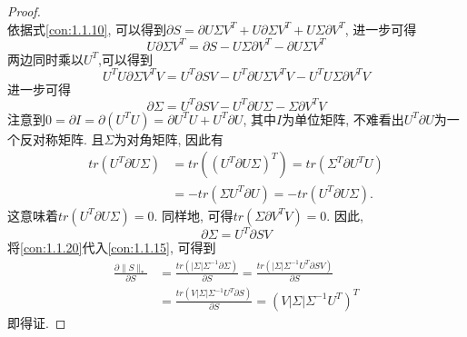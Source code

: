 \documentclass[lang=cn,10pt]{gorgeousnbook}
\numberwithin{equation}{section}%
\numberwithin{figure}{section}%
\begin{document}
\begin{proof}
\begin{equation}
\label{con:1.1.15}
\end{equation}
依据式\eqref{con:1.1.10}, 可以得到$\partial S=\partial U\varSigma V^T+U\partial \varSigma V^T+U\varSigma \partial V^T$, 进一步可得
\begin{equation}
U\partial \varSigma V^T=\partial S-U\varSigma \partial V^T-\partial U\varSigma V^T
\label{con:1.1.16}
\end{equation}
两边同时乘以$U^T$,可以得到
\begin{equation}
U^TU\partial \varSigma V^TV=U^T\partial SV-U^T\partial U\varSigma V^TV-U^TU\varSigma \partial V^TV
\label{con:1.1.17}
\end{equation}
进一步可得
\begin{equation}
\partial \varSigma =U^T\partial SV-U^T\partial U\varSigma -\varSigma \partial V^TV
\label{con:1.1.18}
\end{equation}
注意到$0=\partial I=\partial \left( U^TU \right) =\partial U^TU+U^T\partial U$, 其中$I$为单位矩阵, 不难看出$U^T\partial U$为一个反对称矩阵. 且$\varSigma$为对角矩阵, 因此有
\begin{equation}
\begin{aligned}
tr\left( U^T\partial U\varSigma \right) &=tr\left( \left( U^T\partial U\varSigma \right) ^T \right) =tr\left( \varSigma ^T\partial U^TU \right) 
\\
&=-tr\left( \varSigma U^T\partial U \right) =-tr\left( U^T\partial U\varSigma \right).
\label{con:1.1.19}
\end{aligned}
\end{equation}
这意味着$tr\left( U^T\partial U\varSigma \right) =0$. 同样地, 可得$tr\left( \varSigma \partial V^TV \right) =0$. 因此,
\begin{equation}
\partial \varSigma =U^T\partial SV \label{con:1.1.20}
\end{equation}
将\eqref{con:1.1.20}代入\eqref{con:1.1.15}, 可得到
\begin{equation}
\begin{aligned}
\frac{\partial \lVert S \rVert _*}{\partial S}&=\frac{tr\left( \left| \varSigma \right|\varSigma ^{-1}\partial \varSigma \right)}{\partial S}=\frac{tr\left( \left| \varSigma \right|\varSigma ^{-1}U^T\partial SV \right)}{\partial S}\\
&=\frac{tr\left( V\left| \varSigma \right|\varSigma ^{-1}U^T\partial S \right)}{\partial S}=\left( V\left| \varSigma \right|\varSigma ^{-1}U^T \right) ^T
\label{con:1.1.21}
\end{aligned}
\end{equation}
即得证. 
\end{proof}
\end{document}

